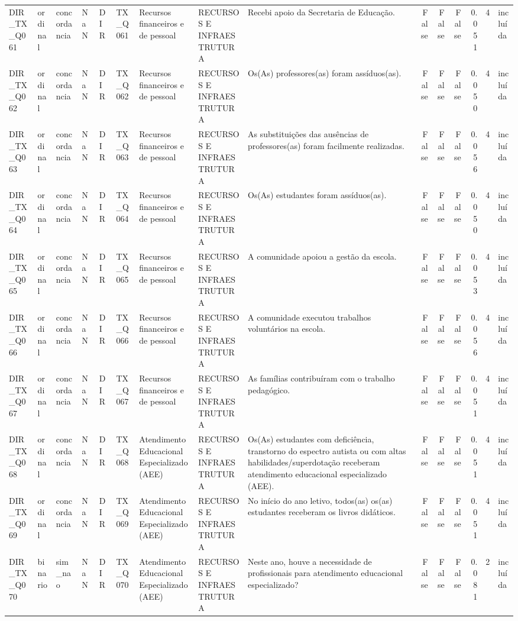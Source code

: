 \begin{tabular}{lllllllllrrrrrl}
DIR\_TX\_Q061 & ordinal & concordancia & NaN & DIR & TX\_Q061 & Recursos financeiros e de pessoal & RECURSOS E INFRAESTRUTURA & Recebi apoio da Secretaria de Educação. & False & False & False & 0.051 & 4 & incluída \\
DIR\_TX\_Q062 & ordinal & concordancia & NaN & DIR & TX\_Q062 & Recursos financeiros e de pessoal & RECURSOS E INFRAESTRUTURA & Os(As) professores(as) foram assíduos(as). & False & False & False & 0.050 & 4 & incluída \\
DIR\_TX\_Q063 & ordinal & concordancia & NaN & DIR & TX\_Q063 & Recursos financeiros e de pessoal & RECURSOS E INFRAESTRUTURA & As substituições das ausências de professores(as) foram facilmente realizadas. & False & False & False & 0.056 & 4 & incluída \\
DIR\_TX\_Q064 & ordinal & concordancia & NaN & DIR & TX\_Q064 & Recursos financeiros e de pessoal & RECURSOS E INFRAESTRUTURA & Os(As) estudantes foram assíduos(as). & False & False & False & 0.050 & 4 & incluída \\
DIR\_TX\_Q065 & ordinal & concordancia & NaN & DIR & TX\_Q065 & Recursos financeiros e de pessoal & RECURSOS E INFRAESTRUTURA & A comunidade apoiou a gestão da escola. & False & False & False & 0.053 & 4 & incluída \\
DIR\_TX\_Q066 & ordinal & concordancia & NaN & DIR & TX\_Q066 & Recursos financeiros e de pessoal & RECURSOS E INFRAESTRUTURA & A comunidade executou trabalhos voluntários na escola. & False & False & False & 0.056 & 4 & incluída \\
DIR\_TX\_Q067 & ordinal & concordancia & NaN & DIR & TX\_Q067 & Recursos financeiros e de pessoal & RECURSOS E INFRAESTRUTURA & As famílias contribuíram com o trabalho pedagógico. & False & False & False & 0.051 & 4 & incluída \\
DIR\_TX\_Q068 & ordinal & concordancia & NaN & DIR & TX\_Q068 & Atendimento Educacional Especializado (AEE) & RECURSOS E INFRAESTRUTURA & Os(As) estudantes com deficiência, transtorno do espectro autista ou com altas habilidades/superdotação receberam atendimento educacional especializado (AEE). & False & False & False & 0.051 & 4 & incluída \\
DIR\_TX\_Q069 & ordinal & concordancia & NaN & DIR & TX\_Q069 & Atendimento Educacional Especializado (AEE) & RECURSOS E INFRAESTRUTURA & No início do ano letivo, todos(as) os(as) estudantes receberam os livros didáticos. & False & False & False & 0.051 & 4 & incluída \\
DIR\_TX\_Q070 & binario & sim\_nao & NaN & DIR & TX\_Q070 & Atendimento Educacional Especializado (AEE) & RECURSOS E INFRAESTRUTURA & Neste ano, houve a necessidade de profissionais para atendimento educacional especializado? & False & False & False & 0.081 & 2 & incluída \\

\end{tabular}
